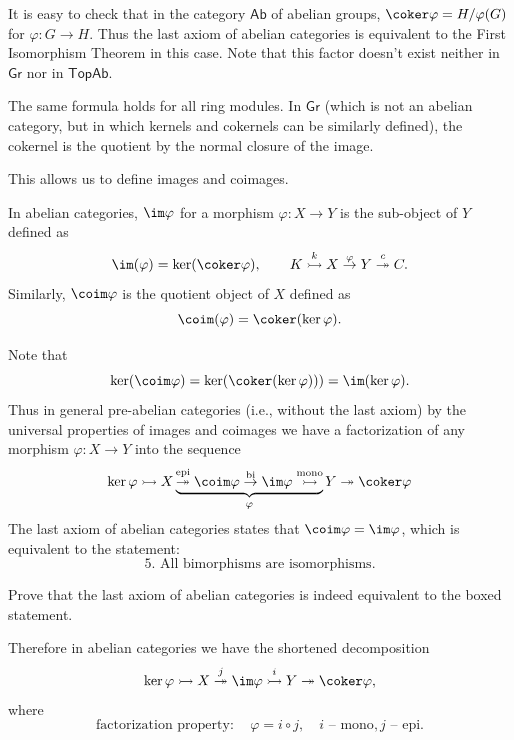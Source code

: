 \begin{example}
    It is easy to check that in the category $\mathsf{Ab}$ of abelian groups, $\coker\varphi=H/\varphi(G)$ for $\varphi:G\to H$. Thus the last axiom of abelian categories is equivalent to the First Isomorphism Theorem in this case. Note that this factor doesn't exist neither in $\mathsf{Gr}$ nor in $\mathsf{TopAb}$.
    
    The same formula holds for all ring modules. In $\mathsf{Gr}$ (which is not an abelian category, but in which kernels and cokernels can be similarly defined), the cokernel is the quotient by the normal closure of the image.
\end{example}

This allows us to define images and coimages.

\begin{defn}
    In abelian categories, $\im\varphi$ for a morphism $\varphi:X\to Y$ is the sub-object of $Y$ defined as
    \[\im(\varphi)=\ker(\coker\varphi),\quad\quad K\overset k \rightarrowtail X\overset\varphi\to Y\overset c\twoheadrightarrow C.\]
    Similarly, $\coim\varphi$ is the quotient object of $X$ defined as 
    \[\coim(\varphi)=\coker(\ker\varphi).\]
\end{defn}

Note that
\[\ker(\coim\varphi)=\ker(\coker(\ker\varphi)))=\im(\ker\varphi).\]
Thus in general pre-abelian categories (i.e., without the last axiom) by the universal properties of images and coimages we have a factorization of any morphism $\varphi:X\to Y$ into the sequence
\[\ker\varphi\rightarrowtail X\underbrace{\overset{\text{epi}}\twoheadrightarrow\coim\varphi\overset{\text{bi}}\to\im\varphi\overset{\text{mono}}\rightarrowtail}_\varphi Y\twoheadrightarrow\coker\varphi \]
The last axiom of abelian categories states that $\coim\varphi = \im\varphi$, which is equivalent to the statement:
\[\boxed{\text{5. All bimorphisms are isomorphisms.}}\]
\begin{xca}
    Prove that the last axiom of abelian categories is indeed equivalent to the boxed statement.
\end{xca}
Therefore in abelian categories we have the shortened decomposition
\[\ker\varphi\rightarrowtail X \overset{j}\twoheadrightarrow\im\varphi\overset{i}\rightarrowtail Y\twoheadrightarrow \coker\varphi,\]
where
\[\text{factorization property}:\quad \varphi=i\circ j,\quad i\text{ -- mono}, j\text{ -- epi}.\]

